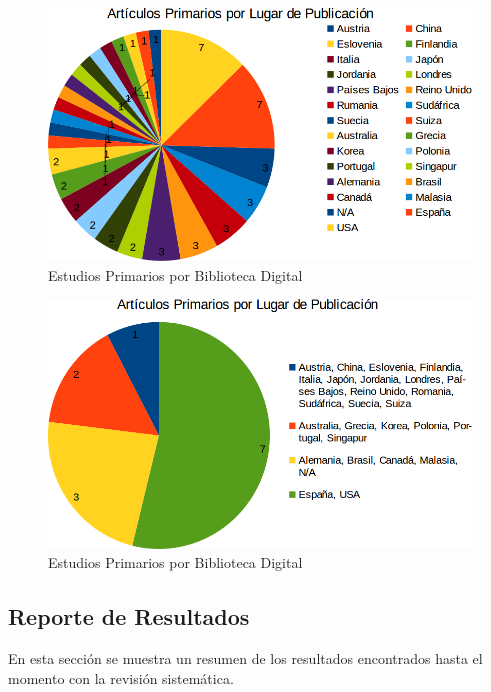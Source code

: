 \documentclass{report}
\begin{document}
            \begin{figure}
        		\begin{center}
        			\includegraphics[scale=0.45]{images/1document/PrimariosLugar.png}
        			\caption{Estudios Primarios por Biblioteca Digital}
		        	\label{primariosLugar}
           		\end{center}
        	\end{figure}
    	    
            \begin{figure}
        		\begin{center}
        			\includegraphics[scale=0.45]{images/1document/PrimariosLugar2.png}
        			\caption{Estudios Primarios por Biblioteca Digital}
		        	\label{primariosLugar2}
           		\end{center}
        	\end{figure}
	
	    \subsection{Reporte de Resultados}
		En esta sección se muestra un resumen de los resultados encontrados hasta el momento con la revisión sistemática.
    	
\end{document}
